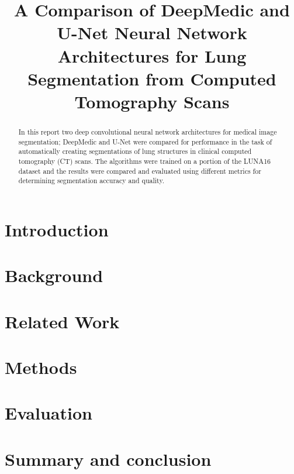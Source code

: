 \documentclass[conference]{IEEEtran}
\begin{document}
\title{A Comparison of DeepMedic and U-Net Neural Network Architectures for Lung Segmentation from Computed Tomography Scans}

\author{
	\and
	\and
	\and
}


\maketitle

\begin{abstract}
In this report two deep convolutional neural network architectures for medical image segmentation; DeepMedic and U-Net were compared for performance in the task of automatically creating segmentations of lung structures in clinical computed tomography (CT) scans. The algorithms were trained on a portion of the LUNA16 dataset and the results were compared and evaluated using different metrics for determining segmentation accuracy and quality.
\end{abstract}

\section{Introduction}



\section{Background}


\section{Related Work}


\section{Methods}


\section{Evaluation}


\section{Summary and conclusion}




\end{document}

